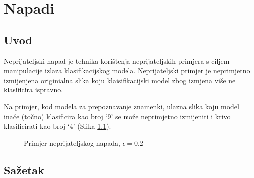 \chapter{Napadi}

\newcommand{\norm}[1]{\left\|{#1}\right\|}

\section{Uvod}

Neprijateljski napad je tehnika korištenja neprijateljskih primjera s ciljem manipulacije izlaza klasifikacijskog modela. Neprijateljski primjer je neprimjetno izmijenjena originialna slika koju klaisifikacijski model zbog izmjena više ne klasificira ispravno.

Na primjer, kod modela za prepoznavanje znamenki, ulazna slika koju model inače (točno) klasificira kao broj ‘9’ se može neprimjetno izmijeniti i krivo klasificirati kao broj ‘4’ (Slika \ref{fig:example}).

\begin{figure}[H]
    \centering
    \qquad
    \caption{Primjer neprijateljskog napada, $\epsilon = 0.2$}%
    \label{fig:example}%
\end{figure}

\section{Sažetak} 

